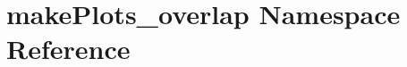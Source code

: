 \hypertarget{namespacemakePlots__overlap}{
\section{makePlots\_\-overlap Namespace Reference}
\label{namespacemakePlots__overlap}
}
